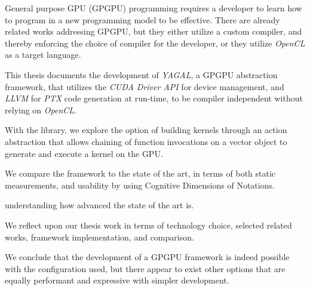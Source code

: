 General purpose GPU (GPGPU) programming requires a developer to learn how to program in a new programming model to be effective. There are already related works addressing GPGPU, but they either utilize a custom compiler, and thereby enforcing the choice of compiler for the developer, or they utilize \textit{OpenCL} as a target language.

This thesis documents the development of \textit{YAGAL}, a GPGPU abstraction framework, that utilizes the \textit{CUDA Driver API} for device management, and \textit{LLVM} for \textit{PTX} code generation at run-time, to be compiler independent without relying on \textit{OpenCL}.

With the library, we explore the option of building kernels through an action abstraction that allows chaining of function invocations on a vector object to generate and execute a kernel on the GPU.

We compare the framework to the state of the art, in terms of both static measurements, and usability by using Cognitive Dimensions of Notations. 

understanding how advanced the state of the art is.

We reflect upon our thesis work in terms of technology choice, selected related works, framework implementation, and comparison.

We conclude that the development of a GPGPU framework is indeed possible with the configuration used, but there appear to exist other options that are equally performant and expressive with simpler development.